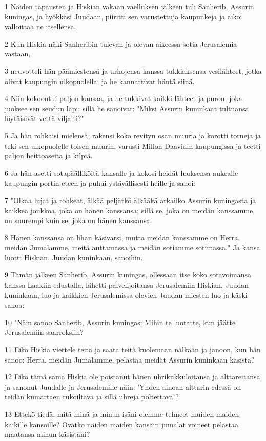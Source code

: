 \par 1 Näiden tapausten ja Hiskian vakaan vaelluksen jälkeen tuli Sanherib, Assurin kuningas, ja hyökkäsi Juudaan, piiritti sen varustettuja kaupunkeja ja aikoi valloittaa ne itsellensä.
\par 2 Kun Hiskia näki Sanheribin tulevan ja olevan aikeessa sotia Jerusalemia vastaan,
\par 3 neuvotteli hän päämiestensä ja urhojensa kanssa tukkiaksensa vesilähteet, jotka olivat kaupungin ulkopuolella; ja he kannattivat häntä siinä.
\par 4 Niin kokoontui paljon kansaa, ja he tukkivat kaikki lähteet ja puron, joka juoksee sen seudun läpi; sillä he sanoivat: "Miksi Assurin kuninkaat tultuansa löytäisivät vettä viljalti?"
\par 5 Ja hän rohkaisi mielensä, rakensi koko revityn osan muuria ja korotti torneja ja teki sen ulkopuolelle toisen muurin, varusti Millon Daavidin kaupungissa ja teetti paljon heittoaseita ja kilpiä.
\par 6 Ja hän asetti sotapäälliköitä kansalle ja kokosi heidät luoksensa aukealle kaupungin portin eteen ja puhui ystävällisesti heille ja sanoi:
\par 7 "Olkaa lujat ja rohkeat, älkää peljätkö älkääkä arkailko Assurin kuningasta ja kaikkea joukkoa, joka on hänen kanssansa; sillä se, joka on meidän kanssamme, on suurempi kuin se, joka on hänen kanssansa.
\par 8 Hänen kanssansa on lihan käsivarsi, mutta meidän kanssamme on Herra, meidän Jumalamme, meitä auttamassa ja meidän sotiamme sotimassa." Ja kansa luotti Hiskian, Juudan kuninkaan, sanoihin.
\par 9 Tämän jälkeen Sanherib, Assurin kuningas, ollessaan itse koko sotavoimansa kanssa Laakiin edustalla, lähetti palvelijoitansa Jerusalemiin Hiskian, Juudan kuninkaan, luo ja kaikkien Jerusalemissa olevien Juudan miesten luo ja käski sanoa:
\par 10 "Näin sanoo Sanherib, Assurin kuningas: Mihin te luotatte, kun jäätte Jerusalemiin saarroksiin?
\par 11 Eikö Hiskia viettele teitä ja saata teitä kuolemaan nälkään ja janoon, kun hän sanoo: Herra, meidän Jumalamme, pelastaa meidät Assurin kuninkaan käsistä?
\par 12 Eikö tämä sama Hiskia ole poistanut hänen uhrikukkuloitansa ja alttareitansa ja sanonut Juudalle ja Jerusalemille näin: 'Yhden ainoan alttarin edessä on teidän kumartaen rukoiltava ja sillä uhreja poltettava'?
\par 13 Ettekö tiedä, mitä minä ja minun isäni olemme tehneet muiden maiden kaikille kansoille? Ovatko näiden maiden kansain jumalat voineet pelastaa maatansa minun käsistäni?
